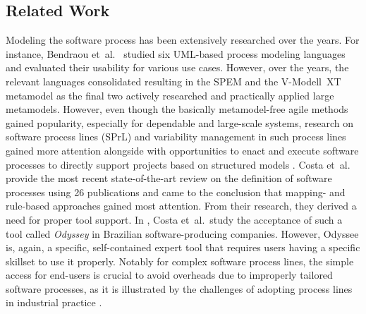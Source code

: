 \subsection{Related Work}
\label{sec:BGAndRW:RW}
Modeling the software process has been extensively researched over the years. For instance, Bendraou et~al.\ \cite{Bendraou:2010jq} studied six UML-based process modeling languages and evaluated their usability for various use cases. However, over the years, the relevant languages consolidated \cite{kuhrmann2013systematic} resulting in the SPEM \cite{OMG2005} and the V-Modell~XT metamodel \cite{kuhrmann2016use} as the final two actively researched and practically applied large metamodels. However, even though the basically metamodel-free agile methods gained popularity, especially for dependable and large-scale systems, research on software process lines (SPrL) and variability management in such process lines gained more attention \cite{Oliveira:1900cr,simmonds2013variability,de2014software,DBLP:journals/jss/KuhrmannTFRB16,costa2018software} alongside with opportunities to enact and execute software processes to directly support projects based on structured models \cite{Bendraou:2007ja,Oliveira:1900cr,Min:1997cq,kktw2010a,DBLP:journals/scp/KuhrmannKT14}. Costa et~al.\ \cite{costa2018software} provide the most recent state-of-the-art review on the definition of software processes using 26 publications and came to the conclusion that mapping- and rule-based approaches gained most attention. From their research, they derived a need for proper tool support. In \cite{costa2020evaluating}, Costa et~al.\ study the acceptance of such a tool called \emph{Odyssey} in Brazilian software-producing companies. However, Odyssee is, again, a specific, self-contained expert tool that requires users having a specific skillset to use it properly. Notably for complex software process lines, the simple access for end-users is crucial to avoid overheads due to improperly tailored software processes, as it is illustrated by the challenges of adopting process lines in industrial practice \cite{simmonds2013variability}.

